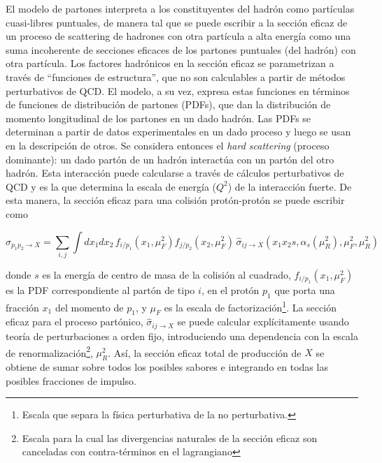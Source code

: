 El modelo de partones interpreta a los constituyentes del hadrón como partículas cuasi-libres puntuales, de manera tal que se puede escribir a la sección eficaz de un proceso de scattering de hadrones con otra partícula a alta energía como una suma incoherente de secciones eficaces de los partones puntuales (del hadrón) con otra partícula. Los factores hadrónicos en la sección eficaz se parametrizan a través de ``funciones de estructura'', que no son calculables a partir de métodos perturbativos de QCD. El modelo, a su vez, expresa estas funciones en términos de funciones de distribución de partones (PDFs), que dan la distribución de momento longitudinal de los partones en un dado hadrón. Las PDFs se determinan a partir de datos experimentales en un dado proceso y luego se usan en la descripción de otros\cite{Greenberg}\cite{Bjorken}. Se considera entonces el \emph{hard scattering} (proceso dominante): un dado partón de un hadrón interactúa con un partón del otro hadrón. Esta interacción puede calcularse a través de cálculos perturbativos de QCD y es la que determina la escala de energía ($Q^2$) de la interacción fuerte. De esta manera, la sección eficaz para una colisión protón-protón se puede escribir como 

$$ \sigma_{p_1p_2\rightarrow X} = \sum_{i,j} \int dx_1 dx_2 \,f_{i/p_1}(x_1,\mu^2_F) f_{j/p_2}(x_2,\mu^2_F)\,\hat{\sigma}_{ij\rightarrow X}(x_1 x_2 s,\alpha_s(\mu^2_R),\mu^2_F,\mu^2_R)$$

\noindent donde $s$ es la energía de centro de masa de la colisión al cuadrado, $f_{i/p_1}(x_1,\mu^2_F)$ es la PDF correspondiente al partón de tipo $i$, en el protón $p_1$ que porta una fracción $x_1$ del momento de $p_1$, y $\mu_F$ es la escala de factorización\footnote{Escala que separa la física perturbativa de la no perturbativa.}. La sección eficaz para el proceso partónico, $\hat{\sigma}_{ij\rightarrow X}$ se puede calcular explícitamente usando teoría de perturbaciones a orden fijo, introduciendo una dependencia con la escala de renormalización\footnote{Escala para la cual las divergencias naturales de la sección eficaz son canceladas con contra-términos en el lagrangiano}, $\mu^2_R$. Así, la sección eficaz total de producción de $X$ se obtiene de sumar sobre todos los posibles sabores e integrando en todas las posibles fracciones de impulso.

